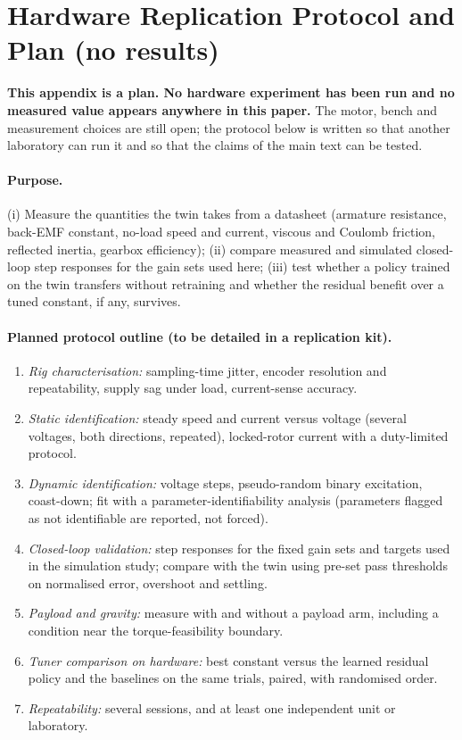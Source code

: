 \section{Hardware Replication Protocol and Plan (no results)}\label{app:hardware}
\textbf{This appendix is a plan. No hardware experiment has been run and no measured value appears anywhere in this paper.} The motor, bench and measurement choices are still open; the protocol below is written so that another laboratory can run it and so that the claims of the main text can be tested.

\paragraph*{Purpose.} (i) Measure the quantities the twin takes from a datasheet (armature resistance, back-EMF constant, no-load speed and current, viscous and Coulomb friction, reflected inertia, gearbox efficiency); (ii) compare measured and simulated closed-loop step responses for the gain sets used here; (iii) test whether a policy trained on the twin transfers without retraining and whether the residual benefit over a tuned constant, if any, survives.

\paragraph*{Planned protocol outline (to be detailed in a replication kit).}
\begin{enumerate}
\item \emph{Rig characterisation:} sampling-time jitter, encoder resolution and repeatability, supply sag under load, current-sense accuracy.
\item \emph{Static identification:} steady speed and current versus voltage (several voltages, both directions, repeated), locked-rotor current with a duty-limited protocol.
\item \emph{Dynamic identification:} voltage steps, pseudo-random binary excitation, coast-down; fit with a parameter-identifiability analysis (parameters flagged as not identifiable are reported, not forced).
\item \emph{Closed-loop validation:} step responses for the fixed gain sets and targets used in the simulation study; compare with the twin using pre-set pass thresholds on normalised error, overshoot and settling.
\item \emph{Payload and gravity:} measure with and without a payload arm, including a condition near the torque-feasibility boundary.
\item \emph{Tuner comparison on hardware:} best constant versus the learned residual policy and the baselines on the same trials, paired, with randomised order.
\item \emph{Repeatability:} several sessions, and at least one independent unit or laboratory.
\end{enumerate}

